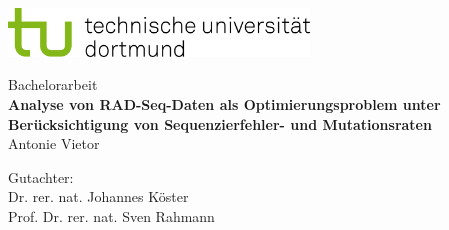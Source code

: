 \begin{titlepage}
	\vspace*{-2cm}
	\newlength{\links}
	\setlength{\links}{-1.5cm}
	\sffamily
	\hspace*{\links}
	\begin{minipage}{12.5cm}
		\includegraphics[width=8cm]{bilder/tud_logo_rgb}
	\end{minipage}

	\vspace*{4.5cm}

	\hspace*{\links}
	\hspace*{-0.7cm}
	\begin{minipage}{17cm}
		\large	
		\begin{center}
			{\Large Bachelorarbeit} \\
			\vspace*{1cm}
			\textbf{Analyse von RAD-Seq-Daten als Optimierungsproblem unter Berücksichtigung von Sequenzierfehler- und Mutationsraten} \\
			\vspace*{1cm}
			Antonie Vietor
		\end{center}
	\end{minipage}
	\normalsize
	\vspace*{4.5cm}



	\vspace*{3.5cm}

	\hspace*{\links}
	\begin{minipage}[b]{8cm}
		\raggedright
		Gutachter: \\
		Dr. rer. nat. Johannes Köster \\
		Prof. Dr. rer. nat. Sven Rahmann \\
	\end{minipage}
	

\end{titlepage}
